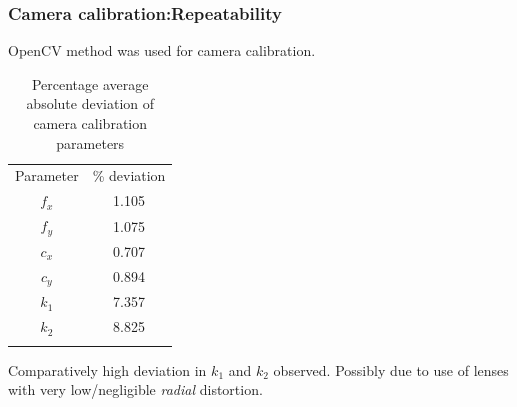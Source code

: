 \documentclass[9pt]{beamer}
\begin{document}

\begin{frame}
\frametitle{Camera calibration:Repeatability}
OpenCV method was used for camera calibration.
\begin{table}[ht]
\centering
\begin{tabular}{c c}
\hline\noalign{\smallskip}
Parameter  & \% deviation \\
\noalign{\smallskip}\hline\noalign{\smallskip}
$f_x$   & 1.105  \\
$f_y$   & 1.075  \\
$c_x$   & 0.707  \\
$c_y$   & 0.894  \\
$k_1$   & 7.357 \\
$k_2$  &  8.825 \\
\noalign{\smallskip}\hline
\end{tabular}
\caption{Percentage average absolute deviation of camera calibration parameters}
\end{table}

Comparatively high deviation in $k_1$ and $k_2$ observed.\newline
Possibly due to use of lenses with very low/negligible \textit{radial} distortion. 
\end{frame}
\end{document}
